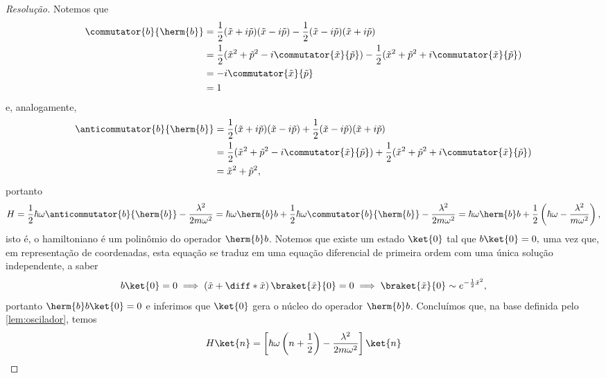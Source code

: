 \begin{proof}[Resolução]
    Notemos que 
    \begin{align*}
        \commutator{b}{\herm{b}} &= \frac12(\tilde{x} + i \tilde{p})(\tilde{x} - i \tilde{p}) - \frac12 (\tilde{x} - i \tilde{p})(\tilde{x} + i \tilde{p})\\
                                  &= \frac12(\tilde{x}^2 + \tilde{p}^2 - i \commutator{\tilde{x}}{\tilde{p}}) - \frac12(\tilde{x}^2 + \tilde{p}^2 + i \commutator{\tilde{x}}{\tilde{p}})\\
                                  &= -i \commutator{\tilde{x}}{\tilde{p}}\\
                                  &= 1
    \end{align*}
    e, analogamente,
    \begin{align*}
        \anticommutator{b}{\herm{b}} &= \frac12(\tilde{x} + i \tilde{p})(\tilde{x} - i \tilde{p}) + \frac12 (\tilde{x} - i \tilde{p})(\tilde{x} + i \tilde{p})\\
                                  &= \frac12(\tilde{x}^2 + \tilde{p}^2 - i \commutator{\tilde{x}}{\tilde{p}}) + \frac12(\tilde{x}^2 + \tilde{p}^2 + i \commutator{\tilde{x}}{\tilde{p}})\\
                                  &= \tilde{x}^2 + \tilde{p}^2,
    \end{align*}
    portanto
    \begin{equation*}
        H = \frac12 \hbar \omega \anticommutator{b}{\herm{b}} - \frac{\lambda^2}{2m \omega^2} = \hbar \omega \herm{b} b + \frac12 \hbar \omega \commutator{b}{\herm{b}} - \frac{\lambda^2}{2m \omega^2} = \hbar \omega \herm{b} b + \frac12 \left(\hbar \omega - \frac{\lambda^2}{m \omega^2}\right),
    \end{equation*}
    isto é, o hamiltoniano é um polinômio do operador \(\herm{b}b\). Notemos que existe um estado \(\ket{0}\) tal que \(b\ket{0} = 0,\) uma vez que, em representação de coordenadas, esta equação se traduz em uma equação diferencial de primeira ordem com uma única solução independente, a saber
    \begin{equation*}
        b\ket{0} = 0 \implies \left(\tilde{x} + \diff*{}{\tilde{x}}\right) \braket{\tilde{x}}{0} = 0\implies \braket{\tilde{x}}{0} \sim e^{-\frac12 \tilde{x}^2},
    \end{equation*}
    portanto \(\herm{b}b\ket{0} = 0\) e inferimos que \(\ket{0}\) gera o núcleo do operador \(\herm{b}b\). Concluímos que, na base definida pelo \cref{lem:oscilador}, temos
    \begin{equation*}
        H \ket{n} = \left[\hbar \omega \left(n + \frac12 \right) - \frac{\lambda^2}{2m \omega^2}\right] \ket{n}

\end{equation*}
\end{proof}

